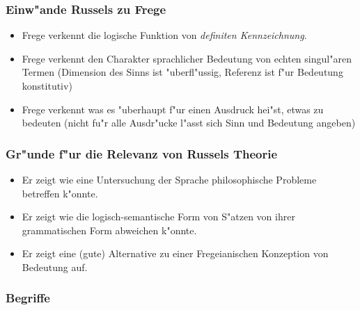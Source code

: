 \documentclass[emulatestandardclasses]{scrartcl}
\begin{document}
\subsubsection{Einw"ande Russels zu Frege}
\begin{itemize}
  \item Frege verkennt die logische Funktion von \emph{definiten Kennzeichnung}.
  \item Frege verkennt den Charakter sprachlicher Bedeutung von echten singul"aren Termen (Dimension des Sinns ist "uberfl"ussig, Referenz ist f"ur Bedeutung konstitutiv)
  \item Frege verkennt was es "uberhaupt f"ur einen Ausdruck hei"st, etwas zu bedeuten (nicht fu"r alle Ausdr"ucke l"asst sich Sinn und Bedeutung angeben)
\end{itemize}

\subsubsection{Gr"unde f"ur die Relevanz von Russels Theorie}
\begin{itemize}
  \item Er zeigt wie eine Untersuchung der Sprache philosophische Probleme betreffen k"onnte.
  \item Er zeigt wie die logisch-semantische Form von S"atzen von ihrer grammatischen Form abweichen k"onnte.
  \item Er zeigt eine (gute) Alternative zu einer Fregeianischen Konzeption von Bedeutung auf.
\end{itemize}

\subsubsection{Begriffe}
\end{document}

